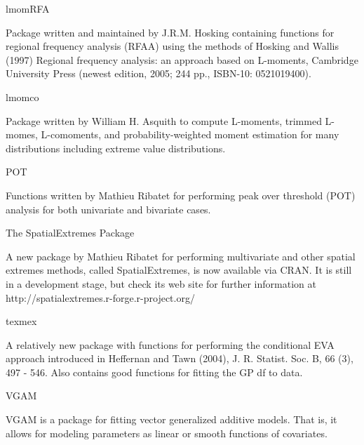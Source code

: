 \begin{frame}
lmomRFA

Package written and maintained by J.R.M. Hosking containing functions for regional frequency analysis (RFAA) using the methods of Hosking and Wallis (1997) Regional frequency analysis: an approach based on L-moments, Cambridge University Press (newest edition, 2005; 244 pp., ISBN-10: 0521019400).

lmomco

Package written by William H. Asquith to compute L-moments, trimmed L-momes, L-comoments, and probability-weighted moment estimation for many distributions including extreme value distributions.

POT

Functions written by Mathieu Ribatet for performing peak over threshold (POT) analysis for both univariate and bivariate cases.

The SpatialExtremes Package

A new package by Mathieu Ribatet for performing multivariate and other spatial extremes methods, called SpatialExtremes, is now available via CRAN. It is still in a development stage, but check its web site for further information at http://spatialextremes.r-forge.r-project.org/

texmex

A relatively new package with functions for performing the conditional EVA approach introduced in Heffernan and Tawn (2004), J. R. Statist. Soc. B, 66 (3), 497 - 546. Also contains good functions for fitting the GP df to data.
\end{frame}
\begin{frame}
VGAM

VGAM is a package for fitting vector generalized additive models. That is, it allows for modeling parameters as linear or smooth functions of covariates.
\end{frame}
